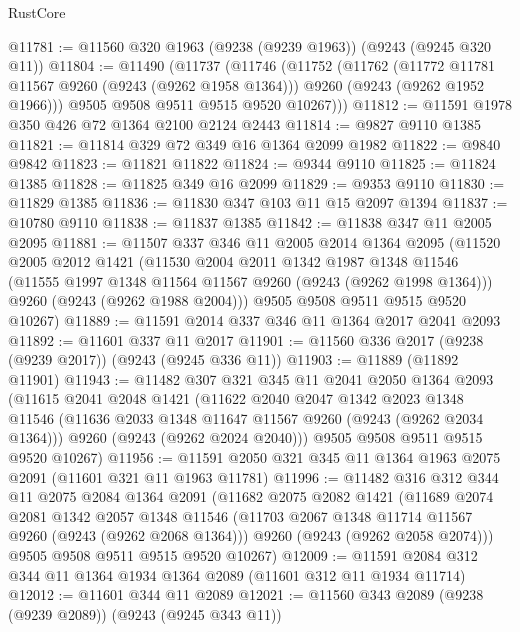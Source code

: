 \begin{lexlean}{RustCore}
\begin{coremodule}
@11781 := @11560 @320 @1963 (@9238 (@9239 @1963)) (@9243 (@9245 @320 @11))
@11804 := @11490
    (@11737
      (@11746
        (@11752
          (@11762
            (@11772 @11781 @11567 @9260 (@9243 (@9262 @1958 @1364)))
            @9260
            (@9243 (@9262 @1952 @1966)))
          @9505
          @9508
          @9511
          @9515
          @9520
          @10267)))
@11812 := @11591 @1978 @350 @426 @72 @1364 @2100 @2124 @2443
@11814 := @9827 @9110 @1385
@11821 := @11814 @329 @72 @349 @16 @1364 @2099 @1982
@11822 := @9840 @9842
@11823 := @11821 @11822
@11824 := @9344 @9110
@11825 := @11824 @1385
@11828 := @11825 @349 @16 @2099
@11829 := @9353 @9110
@11830 := @11829 @1385
@11836 := @11830 @347 @103 @11 @15 @2097 @1394
@11837 := @10780 @9110
@11838 := @11837 @1385
@11842 := @11838 @347 @11 @2005 @2095
@11881 := @11507
    @337
    @346
    @11
    @2005
    @2014
    @1364
    @2095
    (@11520
      @2005
      @2012
      @1421
      (@11530
        @2004
        @2011
        @1342
        @1987
        @1348
        @11546
        (@11555 @1997 @1348 @11564 @11567 @9260 (@9243 (@9262 @1998 @1364)))
        @9260
        (@9243 (@9262 @1988 @2004)))
      @9505
      @9508
      @9511
      @9515
      @9520
      @10267)
@11889 := @11591 @2014 @337 @346 @11 @1364 @2017 @2041 @2093
@11892 := @11601 @337 @11 @2017
@11901 := @11560 @336 @2017 (@9238 (@9239 @2017)) (@9243 (@9245 @336 @11))
@11903 := @11889 (@11892 @11901)
@11943 := @11482
    @307
    @321
    @345
    @11
    @2041
    @2050
    @1364
    @2093
    (@11615
      @2041
      @2048
      @1421
      (@11622
        @2040
        @2047
        @1342
        @2023
        @1348
        @11546
        (@11636 @2033 @1348 @11647 @11567 @9260 (@9243 (@9262 @2034 @1364)))
        @9260
        (@9243 (@9262 @2024 @2040)))
      @9505
      @9508
      @9511
      @9515
      @9520
      @10267)
@11956 := @11591 @2050 @321 @345 @11 @1364 @1963 @2075 @2091 (@11601 @321 @11 @1963 @11781)
@11996 := @11482
    @316
    @312
    @344
    @11
    @2075
    @2084
    @1364
    @2091
    (@11682
      @2075
      @2082
      @1421
      (@11689
        @2074
        @2081
        @1342
        @2057
        @1348
        @11546
        (@11703 @2067 @1348 @11714 @11567 @9260 (@9243 (@9262 @2068 @1364)))
        @9260
        (@9243 (@9262 @2058 @2074)))
      @9505
      @9508
      @9511
      @9515
      @9520
      @10267)
@12009 := @11591 @2084 @312 @344 @11 @1364 @1934 @1364 @2089 (@11601 @312 @11 @1934 @11714)
@12012 := @11601 @344 @11 @2089
@12021 := @11560 @343 @2089 (@9238 (@9239 @2089)) (@9243 (@9245 @343 @11))

\end{coremodule}
\end{lexlean}
